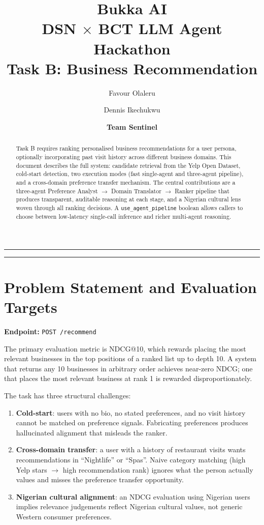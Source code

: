 \documentclass[11pt]{article}
\title{\textbf{Bukka AI} \\ \large DSN $\times$ BCT LLM Agent Hackathon \\ \Large Task B: Business Recommendation}
\author{Favour Olaleru \and Dennis Ikechukwu}
\date{\textbf{Team Sentinel}}
\begin{document}
\maketitle

\hrule
\vspace{1em}

\begin{abstract}
Task B requires ranking personalised business recommendations for a user persona, optionally incorporating past visit history across different business domains. This document describes the full system: candidate retrieval from the Yelp Open Dataset, cold-start detection, two execution modes (fast single-agent and three-agent pipeline), and a cross-domain preference transfer mechanism. The central contributions are a three-agent Preference Analyst $\rightarrow$ Domain Translator $\rightarrow$ Ranker pipeline that produces transparent, auditable reasoning at each stage, and a Nigerian cultural lens woven through all ranking decisions. A \texttt{use\_agent\_pipeline} boolean allows callers to choose between low-latency single-call inference and richer multi-agent reasoning.
\end{abstract}

\vspace{1em}
\hrule
\vspace{2em}

\section{Problem Statement and Evaluation Targets}

\textbf{Endpoint:} \texttt{POST /recommend}

The primary evaluation metric is NDCG@10, which rewards placing the most relevant businesses in the top positions of a ranked list up to depth 10. A system that returns any 10 businesses in arbitrary order achieves near-zero NDCG; one that places the most relevant business at rank 1 is rewarded disproportionately.

The task has three structural challenges:

\begin{enumerate}
    \item \textbf{Cold-start}: users with no bio, no stated preferences, and no visit history cannot be matched on preference signals. Fabricating preferences produces hallucinated alignment that misleads the ranker.
    \item \textbf{Cross-domain transfer}: a user with a history of restaurant visits wants recommendations in ``Nightlife'' or ``Spas''. Naive category matching (high Yelp stars $\rightarrow$ high recommendation rank) ignores what the person actually values and misses the preference transfer opportunity.
    \item \textbf{Nigerian cultural alignment}: an NDCG evaluation using Nigerian users implies relevance judgements reflect Nigerian cultural values, not generic Western consumer preferences.
\end{enumerate}
\end{document}
